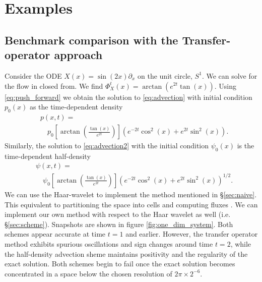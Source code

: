 \documentclass[letterpaper, 10 pt, conference]{ieeeconf}
\begin{document}
\section{Examples}
\label{sec:Examples}

\subsection{Benchmark comparison with the Transfer-operator approach}
Consider the ODE $X(x) = \sin(2x) \partial_x$ on the unit circle, $S^1$.
We can solve for the flow in closed from.  We find
$\Phi_X^t(x) = \arctan( e^{2t} \tan(x) )$.
Using \eqref{eq:push_forward}
we obtain the solution to \eqref{eq:advection} with initial condition $p_0(x)$ as the time-dependent density
\begin{align*}
  &p(x,t) = \\
  &\quad p_0\left[ \arctan \left( \frac{ \tan(x)}{e^{2t}} \right)\right]
  \left( e^{-2t} \cos^2(x) + e^{2t} \sin^2(x) \right).
\end{align*}
Similarly, the solution to \eqref{eq:advection2} with the initial condition $\psi_0(x)$ is the time-dependent half-density
\begin{align*}
  &\psi(x,t) = \\
  &\quad \psi_0\left[\arctan\left( \frac{ \tan(x)}{e^{2t}} \right) \right]
  \left( e^{-2t} \cos^2(x) + e^{2t} \sin^2(x) \right)^{1/2}. 
\end{align*}
We can use the Haar-wavelet to implement the method mentioned in \S \ref{sec:naive}.  This equivalent to partitioning the space into cells and computing fluxes \cite{FroylandJungeKoltai2013}.  We can implement our own method with respect to the Haar wavelet as well (i.e. \S \ref{sec:scheme}).  Snapshots are shown in figure \ref{fig:one_dim_system}.
Both schemes appear accurate at time $t=1$ and earlier.
However, the transfer operator method exhibits spurious oscillations and sign changes around time $t=2$,
 while the half-density advection sheme maintains positivity and the regularity of the exact solution.
Both schemes begin to fail once the exact solution becomes concentrated in a space below the chosen resolution of $2\pi \times 2^{-6}$.
\end{document}

